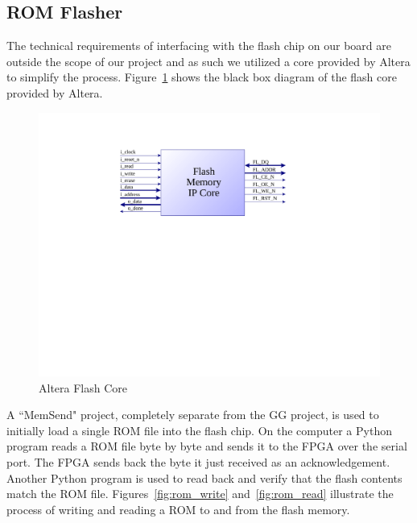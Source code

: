 \documentclass{article}
\begin{document}
\subsection{ROM Flasher}
The technical requirements of interfacing with the flash chip on our board are
outside the scope of our project and as such we utilized a core provided by
Altera \cite{flash_core} to simplify the process.  Figure~\ref{fig:flash_core}
shows the black box diagram of the flash core provided by Altera.

\begin{figure}[H]
\centering
\includegraphics[scale=0.5]{../images/flash_core.pdf}
\caption{Altera Flash Core}
\label{fig:flash_core}
\end{figure}

A ``MemSend" project, completely separate from the GG project, is used to
initially load a single ROM file into the flash chip.  On the computer a Python
program reads a ROM file byte by byte and sends it to the FPGA over the serial
port. The FPGA sends back the byte it just received as an acknowledgement.
Another Python program is used to read back and verify that the flash contents
match the ROM file. Figures~\ref{fig:rom_write} and~\ref{fig:rom_read}
illustrate the process of writing and reading a ROM to and from the flash
memory.
\end{document}
